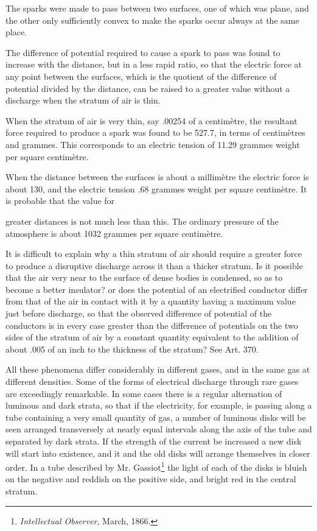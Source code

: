 \documentclass[11pt,a4paper]{article}
\begin{document}
The sparks were made to pass between two surfaces, one of which
was plane, and the other only sufficiently convex to make the sparks
occur always at the same place.

The difference of potential required to cause a spark to pass was
found to increase with the distance, but in a less rapid ratio, so that
the electric force at any point between the surfaces, which is the
quotient of the difference of potential divided by the distance, can
be raised to a greater value without a discharge when the stratum
of air is thin.

When the stratum of air is very thin, say .00254 of a centimètre,
the resultant force required to produce a spark was found to be
527.7, in terms of centimètres and grammes. This corresponds to
an electric tension of 11.29 grammes weight per square centimètre.

When the distance between the surfaces is about a millimètre
the electric force is about 130, and the electric tension .68 grammes
weight per square centimètre. It is probable that the value for

\clearpage
\setcounter{footnote}{0}

greater distances is not much less than this. The ordinary pressure
of the atmosphere is about 1032 grammes per square centimètre.

It is difficult to explain why a thin stratum of air should require
a greater force to produce a disruptive discharge across it than a
thicker stratum. Is it possible that the air very near to the surface
of dense bodies is condensed, so as to become a better insulator?
or does the potential of an electrified conductor differ from
that of the air in contact with it by a quantity having a maximum
value just before discharge, so that the observed difference of
potential of the conductors is in every case greater than the
difference of potentials on the two sides of the stratum of air by a
constant quantity equivalent to the addition of about .005 of an
inch to the thickness of the stratum? See Art. 370.

All these phenomena differ considerably in different gases, and in
the same gas at different densities. Some of the forms of electrical
discharge through rare gases are exceedingly remarkable. In some
cases there is a regular alternation of luminous and dark strata, so
that if the electricity, for example, is passing along a tube containing
a very small quantity of gas, a number of luminous disks will
be seen arranged transversely at nearly equal intervals along the
axis of the tube and separated by dark strata. If the strength of
the current be increased a new disk will start into existence, and
it and the old disks will arrange themselves in closer order. In
a tube described by Mr. Gassiot\footnote{\textit{Intellectual Observer}, March, 1866.}
the light of each of the disks
is bluish on the negative and reddish on the positive side, and
bright red in the central stratum.
\end{document}
